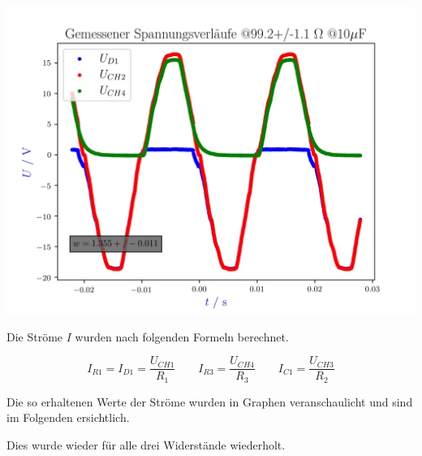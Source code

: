 \documentclass[11pt,ngerman]{scrartcl}
\begin{document}
\begin{center}
	\begin{minipage}[t]{0.8\textwidth}
		\includegraphics[width=\textwidth]{./figures/halbleiter/Versuch3/spannung99.2.png}
		\label{fig:spannung100}
	\end{minipage}
\end{center}

\newpage

Die Ströme $I$ wurden nach folgenden Formeln berechnet.

\begin{equation}
	I_{R1}=I_{D1}=\frac{U_{CH1}}{R_1} \quad \quad I_{R3}=\frac{U_{CH4}}{R_3} \quad \quad I_{C1}=\frac{U_{CH3}}{R_2}
\end{equation}

Die so erhaltenen Werte der Ströme wurden in Graphen veranschaulicht und sind im Folgenden ersichtlich.

\vspace{2mm}

Dies wurde wieder für alle drei Widerstände wiederholt.
\end{document}
